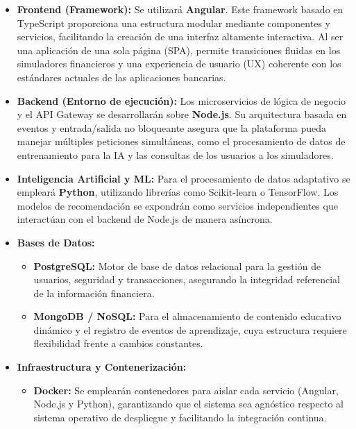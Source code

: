 \begin{itemize}
	\item \textbf{Frontend (Framework):} Se utilizará \textbf{Angular}. Este framework basado en TypeScript proporciona una estructura modular mediante componentes y servicios, facilitando la creación de una interfaz altamente interactiva. Al ser una aplicación de una sola página (SPA), permite transiciones fluidas en los simuladores financieros y una experiencia de usuario (UX) coherente con los estándares actuales de las aplicaciones bancarias.
	
	\item \textbf{Backend (Entorno de ejecución):} Los microservicios de lógica de negocio y el API Gateway se desarrollarán sobre \textbf{Node.js}. Su arquitectura basada en eventos y entrada/salida no bloqueante asegura que la plataforma pueda manejar múltiples peticiones simultáneas, como el procesamiento de datos de entrenamiento para la IA y las consultas de los usuarios a los simuladores.
	
	\item \textbf{Inteligencia Artificial y ML:} Para el procesamiento de datos adaptativo se empleará \textbf{Python}, utilizando librerías como Scikit-learn o TensorFlow. Los modelos de recomendación se expondrán como servicios independientes que interactúan con el backend de Node.js de manera asíncrona.
	
	\item \textbf{Bases de Datos:} 
	\begin{itemize}
		\item \textbf{PostgreSQL:} Motor de base de datos relacional para la gestión de usuarios, seguridad y transacciones, asegurando la integridad referencial de la información financiera.
		\item \textbf{MongoDB / NoSQL:} Para el almacenamiento de contenido educativo dinámico y el registro de eventos de aprendizaje, cuya estructura requiere flexibilidad frente a cambios constantes.
	\end{itemize}
	
	\item \textbf{Infraestructura y Contenerización:} 
	\begin{itemize}
		\item \textbf{Docker:} Se emplearán contenedores para aislar cada servicio (Angular, Node.js y Python), garantizando que el sistema sea agnóstico respecto al sistema operativo de despliegue y facilitando la integración continua.
	\end{itemize}
\end{itemize}

